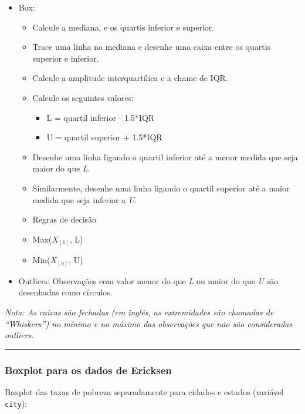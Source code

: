 \documentclass[]{article}
\providecommand{\tightlist}{%
  \setlength{\itemsep}{0pt}\setlength{\parskip}{0pt}}
\begin{document}
\begin{itemize}
\tightlist
\item
  Box:

  \begin{itemize}
  \tightlist
  \item
    Calcule a mediana, e os quartis inferior e superior.
  \item
    Trace uma linha na mediana e desenhe uma caixa entre os quartis
    superior e inferior.
  \item
    Calcule a amplitude interquartílica e a chame de IQR.
  \item
    Calcule os seguintes valores:

    \begin{itemize}
    \tightlist
    \item
      L = quartil inferior - 1.5*IQR
    \item
      U = quartil superior + 1.5*IQR
    \end{itemize}
  \item
    Desenhe uma linha ligando o quartil inferior até a menor medida que
    seja maior do que \emph{L}.
  \item
    Similarmente, desenhe uma linha ligando o quartil superior até a
    maior medida que seja inferior a \emph{U}.
  \item
    Regras de decisão
  \item
    Max(\(X_\left[1 \right]\), L)
  \item
    Min(\(X_\left[n \right]\), U)
  \end{itemize}
\item
  Outliers: Observações com valor menor do que \emph{L} ou maior do que
  \emph{U} são desenhadas como círculos.
\end{itemize}

\emph{Nota: As caixas são fechadas (em inglês, as extremidades são
chamadas de ``Whiskers'') no mínimo e no máximo das observações que não
são consideradas outliers.}

\begin{center}\rule{0.5\linewidth}{\linethickness}\end{center}

\subsubsection{Boxplot para os dados de
Ericksen}\label{boxplot-para-os-dados-de-ericksen}

Boxplot das taxas de pobreza separadamente para cidados e estados
(variável \texttt{city}):
\end{document}
